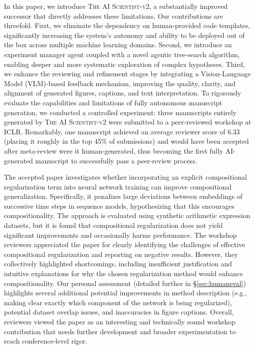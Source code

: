 \documentclass[11pt, a4paper]{include/gdm_format}
\newcommand{\ouralgo}{\textsc{The AI Scientist-v2}\xspace}
\begin{document}
In this paper, we introduce \ouralgo, a substantially improved successor that directly addresses these limitations.
Our contributions are threefold.
First, we eliminate the dependency on human-provided code templates, significantly increasing the system's autonomy and ability to be deployed out of the box across multiple machine learning domains.
Second, we introduce an experiment manager agent coupled with a novel agentic tree-search algorithm, enabling deeper and more systematic exploration of complex hypotheses.
Third, we enhance the reviewing and refinement stages by integrating a Vision-Language Model (VLM)-based feedback mechanism, improving the quality, clarity, and alignment of generated figures, captions, and text interpretation.
%
To rigorously evaluate the capabilities and limitations of fully autonomous manuscript generation, we conducted a controlled experiment: three manuscripts entirely generated by \ouralgo were submitted to a peer-reviewed workshop at ICLR.
Remarkably, one manuscript achieved an average reviewer score of 6.33 (placing it roughly in the top 45\% of submissions) and would have been accepted after meta-review were it human-generated, thus becoming the first fully AI-generated manuscript to successfully pass a peer-review process. 

The accepted paper investigates whether incorporating an explicit compositional regularization term into neural network training can improve compositional generalization. Specifically, it penalizes large deviations between embeddings of successive time steps in sequence models, hypothesizing that this encourages compositionality. The approach is evaluated using synthetic arithmetic expression datasets, but it is found that compositional regularization does not yield significant improvements and occasionally harms performance.
%
The workshop reviewers appreciated the paper for clearly identifying the challenges of effective compositional regularization and reporting on negative results. However, they collectively highlighted shortcomings, including insufficient justification and intuitive explanations for why the chosen regularization method would enhance compositionality.
Our personal assessment (detailed further in \S\ref{sec:humaneval}) highlights several additional potential improvements in method description (e.g., making clear exactly which component of the network is being regularized), potential dataset overlap issues, and inaccuracies in figure captions. Overall, reviewers viewed the paper as an interesting and technically sound workshop contribution that needs further development and broader experimentation to reach conference-level rigor.
\end{document}
